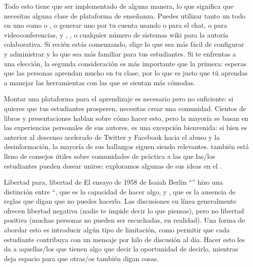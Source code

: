 Todo esto tiene que ser implementado de alguna manera,
lo que significa que necesitas alguna clase de plataforma de enseñanza.
Puedes utilizar tanto un  todo en uno
como  o ,
o generar uno por tu cuenta
usando  o  para el chat,
o  para videoconferencias,
y ,
,
o cualquier número de sistemas wiki para la autoría colaborativa.
Si recién estás comenzando,
elige lo que sea más fácil de configurar y administrar
y lo que sea más familiar para tus estudiantes.
Si te enfrentas a una elección,
la segunda consideración es más importante que la primera:
esperas que las personas aprendan mucho en tu clase,
por lo que es justo que tú aprendas a manejar las herramientas con las que se sientan más cómodas.

Montar una plataforma para el aprendizaje es necesario pero no suficiente:
si quieres que tus estudiantes prosperen,
necesitas crear una comunidad.
Cientos de libros y presentaciones hablan sobre cómo hacer esto,
pero la mayoría se basan en las experiencias personales de sus autores.
\cite{Krau2016} es una excepción bienvenida:
si bien es anterior al descenso acelerado de Twitter y Facebook hacia el abuso y la desinformación,
la mayoría de sus hallazgos siguen siendo relevantes.
\cite{Foge2005} también está lleno de consejos útiles
sobre comunidades de práctica a las que las/los estudiantes pueden desear unirse;
exploramos algunas de sus ideas en el .

\begin{aside}{Libertad para, libertad de}
  El ensayo de 1958 de Isaiah Berlin
  ``''
  hizo una distinción entre ``,
  que es la capacidad de hacer algo,
  y ,
  que es la ausencia de reglas que digan que no puedes hacerlo.
  Las discusiones en línea generalmente ofrecen libertad negativa
  (nadie te impide decir lo que piensas),
  pero no libertad positiva
  (muchas personas no pueden ser escuchadas, en realidad).
  Una forma de abordar esto es introducir algún tipo de limitación,
  como permitir que cada estudiante contribuya con un mensaje por hilo de discusión al día.
  Hacer esto les da a aquellas/los que tienen algo que decir la oportunidad de decirlo,
  mientras deja espacio para que otras/os también digan cosas.
\end{aside}

